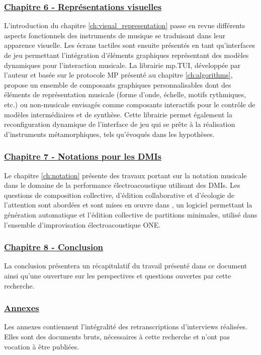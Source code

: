 \subsubsection*{\hyperref[ch:visual_representation]{Chapitre 6 - Représentations visuelles}}

\noindent L'introduction du chapitre \ref{ch:visual_representation} passe en revue différents aspects fonctionnels des instruments de musique se traduisant dans leur apparence visuelle. Les écrans tactiles sont ensuite présentés en tant qu'interfaces de jeu permettant l'intégration d'éléments graphiques représentant des modèles dynamiques pour l'interaction musicale. La librairie mp.TUI, développée par l'auteur et basée sur le protocole MP présenté au chapitre  \ref{ch:algorithms}, propose un ensemble de composants graphiques personnalisables dont des éléments de représentation musicale (forme d'onde, échelle, motifs rythmiques, etc.) ou non-musicale envisagés comme composants interactifs pour le contrôle de modèles intermédiaires et de synthèse. Cette librairie permet également la reconfiguration dynamique de l'interface de jeu qui se prête à la réalisation d'instruments métamorphiques, tels qu'évoqués dans les hypothèses.

\subsubsection*{\hyperref[ch:notation]{Chapitre 7 - Notations pour les DMIs}} 
\noindent Le chapitre \ref{ch:notation} présente des travaux portant sur la notation musicale dans le domaine de la performance électroacoustique utilisant des \glspl{DMI}. Les questions de composition collective, d'édition collaborative et d'écologie de l'attention sont abordées et sont mises en œuvre dans , un logiciel permettant la génération automatique et l'édition collective de partitions minimales, utilisé dans l'ensemble d'improvisation électroacoustique ONE. 

\subsubsection*{\hyperref[ch:conclusion]{Chapitre 8 - Conclusion}} 
\noindent La conclusion présentera un récapitulatif du travail présenté dans ce document ainsi qu'une ouverture sur les perspectives et questions ouvertes par cette recherche.

\subsubsection*{\hyperref[appendix:delaubier]{Annexes}} 
\noindent Les annexes contiennent l'intégralité des retranscriptions d'interviews réalisées. Elles sont des documents bruts, nécessaires à cette recherche et n'ont pas vocation à être publiées.